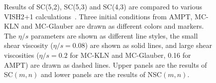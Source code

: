 \begin{figure}[!]
\begin{center}
        \caption{Results of  SC(5,2), SC(5,3) and SC(4,3) are compared to various VISH2+1 calculations~\cite{Zhu:2016puf}. Three initial conditions from AMPT, MC-KLN and MC-Glauber are drawn as different colors and markers. The $\eta/s$ parameters are shown as different line styles, the small shear viscosity ($\eta/s=0.08$) are shown as solid lines, and large shear viscosities ($\eta/s=0.2$ for MC-KLN and MC-Glauber, 0.16 for AMPT) are drawn as dashed lines. Upper panels are the results of SC$(m,n)$ and lower panels are the results of NSC$(m,n)$.}
        \label{fig:Figure_6}
        \end{center}   
 \end{figure}
 
